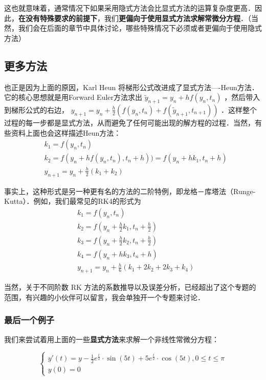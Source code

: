 这也就意味着，通常情况下如果采用隐式方法会比显式方法的运算复杂度更高．因此，\textbf{在没有特殊要求的前提下}，我们\textbf{更偏向于使用显式方法求解常微分方程}．（当然，我们会在后面的章节中具体讨论，哪些特殊情况下必须或者更偏向于使用隐式方法）

\subsection{更多方法}

也正是因为上面的原因，Karl Heun 将梯形公式改进成了显式方法----Heun方法．它的核心思想就是用Forward Euler方法求出 $\tilde{y}_{n+1}=y_n+hf(y_n,t_n)$ ，然后带入到梯形公式的右边， $y_{n+1}=y_n+\frac{h}{2}\left(f(y_n,t_n)+f(\tilde{y}_{n+1},t_{n+1}) \right)$ ．这样整个过程的每一步都是显式方法，从而避免了任何可能出现的解方程的过程．当然，有些资料上面也会这样描述Heun方法：
\begin{equation}
\begin{aligned}
&k_1=f(y_n,t_n)\\
&k_2=f(y_n+hf(y_n,t_n),t_n+h))=f(y_n+hk_1,t_n+h)\\
&y_{n+1}=y_n+\frac{h}{2}(k_1+k_2)
\end{aligned}
\end{equation}

事实上，这种形式是另一种更有名的方法的二阶特例，即龙格－库塔法（Runge-Kutta）．例如，我们最常见的RK4的形式为
\begin{equation}
\begin{aligned}
&k_1=f(y_n,t_n)\\
&k_2=f\left(y_n+\frac{h}{2}k_1, t_n+\frac{h}{2}\right)\\
&k_3=f\left(y_n+\frac{h}{2}k_2, t_n+\frac{h}{2}\right)\\
&k_4=f\left(y_n+hk_3, t_n+h\right)\\
&y_{n+1}=y_{n}+\frac{h}{6}(k_1+2k_2+2k_3+k_4)
\end{aligned}
\end{equation}

当然，关于不同阶数 RK 方法的系数推导以及误差分析，已经超出了这个专题的范围，有兴趣的小伙伴可以留言，我会单独开一个专题来讨论．

\subsubsection{最后一个例子}

我们来尝试着用上面的一些\textbf{显式方法}来求解一个非线性常微分方程：

\begin{equation}
\begin{cases}
 y'(t) = y-\frac{1}{2}e^{\frac{t}{2}}\cdot\sin(5t)+5e^{\frac{t}{2}}\cdot\cos(5t), 0\le t\le \pi\\ y(0)=0
\end{cases}
\end{equation}

